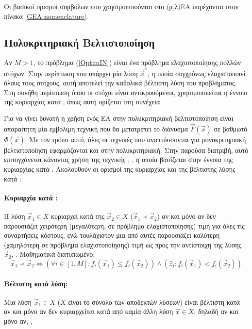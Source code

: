 Οι βασικοί ορισμοί συμβόλων που χρησιμοποιούνται στο (μ,λ)ΕΑ παρέχονται στον πίνακα \ref{GEA nomenclature}.

\subsection{Πολυκριτηριακή Βελτιστοποίηση}
\label{MOOini}
Αν $M\!>\!1$, το πρόβλημα (\ref{OptimIN}) είναι ένα πρόβλημα ελαχιστοποίησης πολλών στόχων. Στην περίπτωση που υπάρχει μία λύση $\vec{x}^*$, η οποία συγχρόνως ελαχιστοποιεί όλους τους στόχους, αυτή αποτελεί την καθολικά βέλτιστη λύση του προβλήματος. Στη συνήθη περίπτωση όπου οι στόχοι είναι αντικρουόμενοι, χρησιμοποιείται η έννοια της κυριαρχίας κατά , όπως αυτή ορίζεται στη συνέχεια.

Για να γίνει δυνατή η χρήση ενός ΕΑ στην πολυκριτηριακή βελτιστοποίηση είναι απαραίτητη μία εμβόλιμη τεχνική που θα μετατρέπει το διάνυσμα $\vec{F}(\vec{x})$ σε βαθμωτό $\Phi(\vec{x})$. Με τον τρόπο αυτό, όλες οι τεχνικές που αναπτύσσονται για μονοκριτηριακή βελτιστοποίηση εφαρμόζονται και στην πολυκριτηριακή. Στην παρούσα διατριβή, αυτό επιτυγχάνεται κάνοντας χρήση της τεχνικής , \cite{Zitz02,Zitz01}, η οποία βασίζεται στην έννοια της κυριαρχίας κατά . Ακολουθούν οι ορισμοί της κυριαρχίας και της βέλτιστης λύσης κατά :    

\paragraph{Κυριαρχία κατά :} 
     Η λύση $\vec{x}_1\!\in\!X$ κυριαρχεί κατά  της $\vec{x}_2\!\in\!X$ ($\vec{x}_1\prec\vec{x}_2$) αν και μόνο αν δεν παρουσιάζει χειρότερη (μεγαλύτερη, σε πρόβλημα ελαχιστοποίησης) τιμή για όλες τις συναρτήσεις κόστους, ενώ τουλάχιστον μια από αυτές παρουσιάζει καλύτερη (χαμηλότερη σε πρόβλημα ελαχιστοποίησης) τιμή ως προς την αντίστοιχη της	λύσης $\vec{x}_2$, \cite{Gold89}. Μαθηματικά διατυπωμένο: 
\begin{equation}
    \vec{x}_1\prec\vec{x}_2 \Leftrightarrow (\forall i \in[1,M] :  f_i(\vec{x}_1) \leq f_i(\vec{x}_2))\wedge (\exists _i : f_i(\vec{x}_1) < f_i(\vec{x}_2))
    \label{pareto_eq} 
\end{equation}

\paragraph{Βέλτιστη κατά  λύση:} 
Μια λύση $\vec{x}_1\!\in\!X$ ($X$ είναι το σύνολο των αποδεκτών λύσεων) είναι βέλτιστη κατά  αν και μόνο αν δεν κυριαρχείται κατά  από καμία άλλη λύση $\vec{x}\!\in\!X$, δηλαδή αν και μόνο αν, \cite{Gold89},

